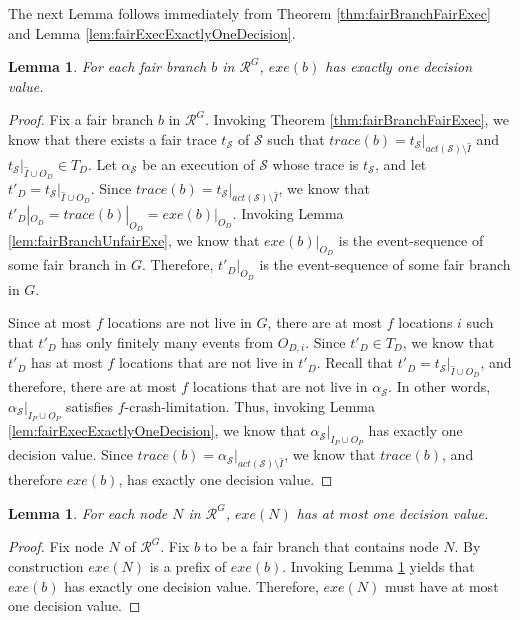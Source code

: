 \documentclass[11pt]{article}
\numberwithin{theorem}{section}
\newtheorem{lemma}[theorem]{Lemma}
\begin{document}
The next Lemma follows immediately from Theorem \ref{thm:fairBranchFairExec} and Lemma \ref{lem:fairExecExactlyOneDecision}.
\begin{lemma}\label{prop:fairBranchOneDecision}
 For each fair branch $b$ in $\mathcal{R}^{G}$, $exe(b)$ has exactly one decision value.
\end{lemma}
\begin{proof}
Fix a fair branch $b$ in $\mathcal{R}^{G}$. Invoking Theorem \ref{thm:fairBranchFairExec}, we know that there exists a fair trace $t_\mathcal{S}$ of $\mathcal{S}$ such that $trace(b) = t_\mathcal{S}|_{act(\mathcal{S}) \setminus \hat{I}}$ and $t_\mathcal{S}|_{\hat{I} \cup O_D} \in T_D$. Let $\alpha_\mathcal{S}$ be an execution of $\mathcal{S}$ whose trace is $t_\mathcal{S}$, and let $t'_D = t_\mathcal{S}|_{\hat{I} \cup O_D}$. Since $trace(b) = t_\mathcal{S}|_{act(\mathcal{S}) \setminus \hat{I}}$, we know that $t'_D|_{O_D} = trace(b)|_{O_D} = exe(b)|_{O_D}$. Invoking Lemma \ref{lem:fairBranchUnfairExe}, we know that $exe(b)|_{O_D}$ is the event-sequence of some fair branch in $G$. Therefore, $t'_D|_{O_D}$ is the event-sequence of some fair branch in $G$.
 
Since at most $f$ locations are not live in $G$, there are at most $f$ locations $i$ such that $t'_D$ has only finitely many events from $O_{D,i}$. Since $t'_D \in T_D$, we know that $t'_D$ has at most $f$ locations that are not live in $t'_D$. Recall that $t'_D = t_\mathcal{S}|_{\hat{I} \cup O_D}$, and therefore, there are at most $f$ locations that are not live in $\alpha_\mathcal{S}$. In other words,  $\alpha_\mathcal{S}|_{I_P \cup O_P}$
satisfies $f$-crash-limitation. Thus, invoking Lemma \ref{lem:fairExecExactlyOneDecision}, we know that $\alpha_\mathcal{S}|_{I_P \cup O_P}$ has exactly one decision value. Since $trace(b) = \alpha_\mathcal{S}|_{act(\mathcal{S}) \setminus \hat{I}}$, we know that $trace(b)$, and therefore $exe(b)$, has exactly one decision value.
\end{proof}
\begin{lemma}\label{prop:eachNodeAtMostOneDecision}
 For each node $N$ in $\mathcal{R}^{G}$, $exe(N)$ has at most one decision value.
\end{lemma}
\begin{proof}
Fix node $N$ of $\mathcal{R}^G$. Fix $b$ to be a fair branch that contains node $N$. By construction $exe(N)$ is a prefix of $exe(b)$. Invoking Lemma \ref{prop:fairBranchOneDecision} yields that $exe(b)$ has exactly one decision value. Therefore, $exe(N)$ must have at most one decision value.
\end{proof}
\end{document}
